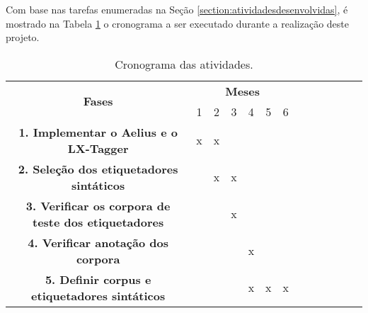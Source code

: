 Com base nas tarefas enumeradas na Seção \ref{section:atividadesdesenvolvidas}, é mostrado na Tabela \ref{tab:cronograma} o cronograma a ser executado durante a realização deste projeto.

\begin{table}[ht]
\centering
\caption{Cronograma das atividades.}
\begin{tabular}{|c|c|c|c|c|c|c|c|c|c|c|c|c|}
\hline
\multirow{2}{*}{{\bf Fases}} & \multicolumn{6}{c|}{{\bf Meses}}
\\ \cline{2-7}
    & 1 & 2 & 3 & 4 & 5 & 6 
\\ \hline
    {\bf 1. Implementar o Aelius e o LX-Tagger} & x & x &  & & & 
\\ \hline
    {\bf 2. Seleção dos etiquetadores sintáticos} &  & x & x & & &
\\ \hline
    {\bf 3. Verificar os corpora de teste dos etiquetadores} & & & x & &  &  
\\ \hline
    {\bf 4. Verificar anotação dos corpora} & & &  & x&  & 
\\ \hline
    {\bf 5. Definir corpus e etiquetadores sintáticos} & & & & x & x & x
\\ \hline
\end{tabular}
\label{tab:cronograma}
\end{table}


